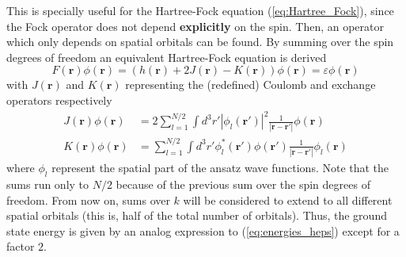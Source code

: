 This is specially useful for the Hartree-Fock equation (\ref{eq:Hartree_Fock}), since the Fock operator does not depend \textbf{explicitly} on the spin. Then, an operator which only depends on spatial orbitals can be found. By summing over the spin degrees of freedom an equivalent Hartree-Fock equation is derived
\begin{equation}
	F(\mathbf{r})\phi(\mathbf{r}) = \left(h(\mathbf{r})+2J (\mathbf{r})-K (\mathbf{r})\right)\phi (\mathbf{r})=\varepsilon\phi (\mathbf{r})
	\label{eq:new_HF}
\end{equation}
with $J (\mathbf{r}) $ and $K (\mathbf{r}) $ representing the (redefined) Coulomb and exchange operators respectively
\begin{align}
	J (\mathbf{r})\phi (\mathbf{r}) &= 2 \sum_{l=1}^{N/2}\int{d^3r'\left|\phi_l(\mathbf{r'})\right|^2\frac{1}{\left|\mathbf{r}-\mathbf{r'}\right|}\phi(\mathbf{r})}\\
	K (\mathbf{r})\phi (\mathbf{r}) &= \sum_{l =1}^{N/2}\int{d^3r'\phi_l^*(\mathbf{r'})\phi (\mathbf{r'})\frac{1}{\left|\mathbf{r}-\mathbf{r'}\right|}\phi_l (\mathbf{r})}
	\label{eq:coulomb_exchange}
\end{align}
where $\phi_l$ represent the spatial part of the ansatz wave functions.
Note that the sums run only to $N/2$ because of the previous sum over the spin degrees of freedom. From now on, sums over $k$ will be considered to extend to all different spatial orbitals (this is, half of the total number of orbitals). Thus, the ground state energy is given by
an analog expression to (\ref{eq:energies_heps}) except for a factor $2$.%


